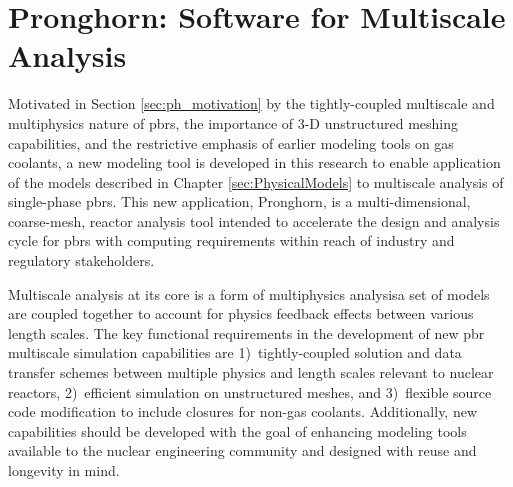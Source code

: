 \chapter{Pronghorn: Software for Multiscale Analysis}
\label{sec:ph}


Motivated in Section \ref{sec:ph_motivation} by the tightly-coupled multiscale and multiphysics nature of \glspl{pbr}, the importance of 3-D unstructured meshing capabilities, and the restrictive emphasis of earlier modeling tools on gas coolants, a new modeling tool is developed in this research to enable application of the models described in Chapter \ref{sec:PhysicalModels} to multiscale analysis of single-phase \glspl{pbr}. This new application, Pronghorn, is a multi-dimensional, coarse-mesh, reactor analysis tool intended to accelerate the design and analysis cycle for \glspl{pbr} with computing requirements within reach of industry and regulatory stakeholders. 

Multiscale analysis at its core is a form of multiphysics analysis\mdash a set of models are coupled together to account for physics feedback effects between various length scales. The key functional requirements in the development of new \gls{pbr} multiscale simulation capabilities are 1)~tightly-coupled solution and data transfer schemes between multiple physics and length scales relevant to nuclear reactors, 2)~efficient simulation on unstructured meshes, and 3)~flexible source code modification to include closures for non-gas coolants. Additionally, new capabilities should be developed with the goal of enhancing modeling tools available to the nuclear engineering community and designed with reuse and longevity in mind.

